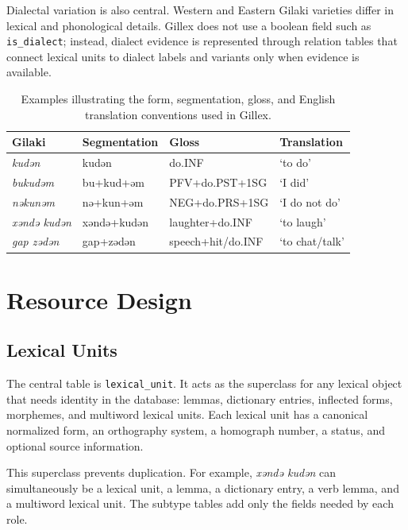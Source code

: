 \documentclass[11pt]{article}
\begin{document}
Dialectal variation is also central. Western and Eastern Gilaki varieties differ in lexical and phonological details. Gillex does not use a boolean field such as \texttt{is\_dialect}; instead, dialect evidence is represented through relation tables that connect lexical units to dialect labels and variants only when evidence is available.

\begin{table}[t]
\centering
\small
\begin{tabular}{llll}
\toprule
Gilaki & Segmentation & Gloss & Translation \\
\midrule
\textit{kudǝn} & kudǝn & do.INF & `to do' \\
\textit{bukudǝm} & bu+kud+ǝm & PFV+do.PST+1SG & `I did' \\
\textit{nǝkunǝm} & nǝ+kun+ǝm & NEG+do.PRS+1SG & `I do not do' \\
\textit{xǝndǝ kudǝn} & xǝndǝ+kudǝn & laughter+do.INF & `to laugh' \\
\textit{gap zǝdǝn} & gap+zǝdǝn & speech+hit/do.INF & `to chat/talk' \\
\bottomrule
\end{tabular}
\caption{Examples illustrating the form, segmentation, gloss, and English translation conventions used in Gillex.}
\label{tab:examples}
\end{table}

\section{Resource Design}

\subsection{Lexical Units}

The central table is \texttt{lexical\_unit}. It acts as the superclass for any lexical object that needs identity in the database: lemmas, dictionary entries, inflected forms, morphemes, and multiword lexical units. Each lexical unit has a canonical normalized form, an orthography system, a homograph number, a status, and optional source information.

This superclass prevents duplication. For example, \textit{xǝndǝ kudǝn} can simultaneously be a lexical unit, a lemma, a dictionary entry, a verb lemma, and a multiword lexical unit. The subtype tables add only the fields needed by each role.
\end{document}

